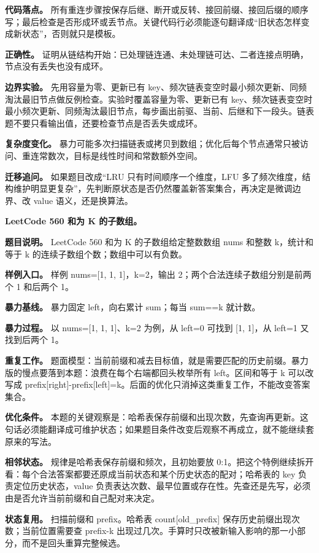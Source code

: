 \textbf{代码落点。} 所有重连步骤按保存后继、断开或反转、接回前缀、接回后缀的顺序写；最后检查是否形成环或丢节点。关键代码行必须能逐句翻译成“旧状态怎样变成新状态”，否则就只是模板。

\textbf{正确性。} 证明从链结构开始：已处理链连通、未处理链可达、二者连接点明确，节点没有丢失也没有成环。

\textbf{边界实验。} 先用容量为零、更新已有 key、频次链表变空时最小频次更新、同频淘汰最旧节点做反例检查。实验时覆盖容量为零、更新已有 key、频次链表变空时最小频次更新、同频淘汰最旧节点，每步画出前驱、当前、后继和下一段头。链表题不要只看输出值，还要检查节点是否丢失或成环。

\textbf{复杂度变化。} 暴力可能多次扫描链表或拷贝到数组；优化后每个节点通常只被访问、重连常数次，目标是线性时间和常数额外空间。

\textbf{迁移追问。} 如果题目改成“LRU 只有时间顺序一个维度，LFU 多了频次维度，结构维护明显更复杂”，先判断原状态是否仍然覆盖新答案集合，再决定是微调边界、改 value 语义，还是换算法。

\noindent\textbf{LeetCode 560 和为 K 的子数组。}

\textbf{题目说明。} LeetCode 560 和为 K 的子数组给定整数数组 nums 和整数 k，统计和等于 k 的连续子数组个数；数组中可以有负数。

\textbf{样例入口。} 样例 nums=[1, 1, 1]，k=2，输出 2；两个合法连续子数组分别是前两个 1 和后两个 1。

\textbf{暴力基线。} 暴力固定 left，向右累计 sum；每当 sum==k 就计数。

\textbf{暴力过程。} 以 nums=[1, 1, 1]、k=2 为例，从 left=0 可找到 [1, 1]，从 left=1 又找到后两个 1。

\textbf{重复工作。} 题面模型：当前前缀和减去目标值，就是需要匹配的历史前缀。暴力版的慢点要落到本题：浪费在每个右端都回头枚举所有 left。区间和等于 k 可以改写成 prefix[right]-prefix[left]=k。后面的优化只消掉这类重复工作，不能改变答案集合。

\textbf{优化条件。} 本题的关键观察是：哈希表保存前缀和出现次数，先查询再更新。这句话必须能翻译成可维护状态；如果题目条件改变后观察不再成立，就不能继续套原来的写法。

\textbf{相邻状态。} 规律是哈希表保存前缀和频次，且初始要放 0:1。把这个特例继续拆开看：每个合法答案都要还原成当前状态和某个历史状态的配对；哈希表的 key 负责定位历史状态，value 负责表达次数、最早位置或存在性。先查还是先写，必须由是否允许当前前缀和自己配对来决定。

\textbf{状态复用。} 扫描前缀和 prefix。哈希表 count[old\_prefix] 保存历史前缀出现次数；当前位置需要查 prefix-k 出现过几次。手算时只改被新输入影响的那一小部分，而不是回头重算完整候选。

